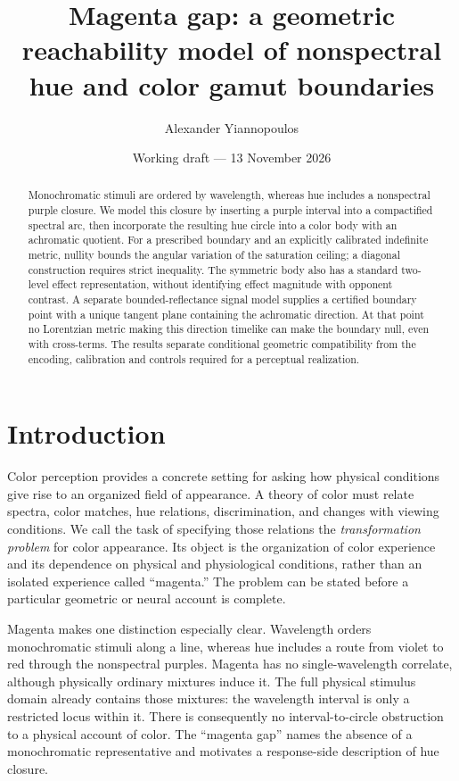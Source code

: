 \documentclass[11pt,letterpaper]{article}
\date{Working draft --- 13 November 2026}
\title{Magenta gap: a geometric reachability model of nonspectral hue and color gamut boundaries}
\author[1,*]{Alexander Yiannopoulos}
\affil[1]{A$\lvert\Omega\rangle$ Institute, Alpha Omega Lattice Corporation, 3724 Laurel Street, Suite 108, New Orleans, Louisiana, USA}
\affil[*]{ayianno@ao.institute}
\theoremstyle{plain}
\begin{document}
\maketitle
\begin{abstract}
\noindent
Monochromatic stimuli are ordered by wavelength, whereas hue includes a nonspectral purple closure. We model this closure by inserting a purple interval into a compactified spectral arc, then incorporate the resulting hue circle into a color body with an achromatic quotient. For a prescribed boundary and an explicitly calibrated indefinite metric, nullity bounds the angular variation of the saturation ceiling; a diagonal construction requires strict inequality. The symmetric body also has a standard two-level effect representation, without identifying effect magnitude with opponent contrast. A separate bounded-reflectance signal model supplies a certified boundary point with a unique tangent plane containing the achromatic direction. At that point no Lorentzian metric making this direction timelike can make the boundary null, even with cross-terms. The results separate conditional geometric compatibility from the encoding, calibration and controls required for a perceptual realization.
\end{abstract}

\section{Introduction}
\label{sec:introduction}
Color perception provides a concrete setting for asking how physical conditions give rise to an organized field of appearance. A theory of color must relate spectra, color matches, hue relations, discrimination, and changes with viewing conditions. We call the task of specifying those relations the \emph{transformation problem} for color appearance. Its object is the organization of color experience and its dependence on physical and physiological conditions, rather than an isolated experience called ``magenta.'' The problem can be stated before a particular geometric or neural account is complete.

Magenta makes one distinction especially clear. Wavelength orders monochromatic stimuli along a line, whereas hue includes a route from violet to red through the nonspectral purples. Magenta has no single-wavelength correlate, although physically ordinary mixtures induce it. The full physical stimulus domain already contains those mixtures: the wavelength interval is only a restricted locus within it. There is consequently no interval-to-circle obstruction to a physical account of color. The ``magenta gap'' names the absence of a monochromatic representative and motivates a response-side description of hue closure.
\end{document}
